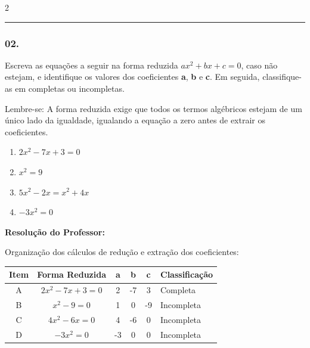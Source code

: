 \begin{multicols*}{2}
\par\vspace{\espacoQuestao}

\noindent\textcolor{CorLinha}{\rule{\linewidth}{0.5pt}} 
\par\vspace{\espacoPreQuestao}
\subsubsection*{02.} Escreva as equações a seguir na forma reduzida $ ax^2 + bx + c = 0 $, caso não estejam, e identifique os valores dos coeficientes \textbf{a}, \textbf{b} e \textbf{c}. Em seguida, classifique-as em completas ou incompletas.
\begin{boxdica}
Lembre-se: A forma reduzida exige que todos os termos algébricos estejam de um único lado da igualdade, igualando a equação a zero antes de extrair os coeficientes.
\end{boxdica}
\begin{enumerate}[label=\Alph*), itemsep=\espacoAlt]
    \item $ 2x^2 - 7x + 3 = 0 $
    \item $ x^2 = 9 $
    \item $ 5x^2 - 2x = x^2 + 4x $
    \item $ -3x^2 = 0 $
\end{enumerate}

\ifgabarito
    \begin{tcolorbox}[colback=CorTitUm!5, colframe=CorTitUm, boxrule=1pt, arc=4pt, left=6pt, right=6pt, top=6pt, bottom=6pt]
    \small\textbf{\textcolor{CorTitUm}{Resolução do Professor:}}\par\vspace{0.1cm}
    \color{CinzaEscuro}
    Organização dos cálculos de redução e extração dos coeficientes:
    \vspace{0.2cm}
    \begin{center}
    \begin{tabular}{|c|c|c|c|c|l|}
    \hline
    \textbf{Item} & \textbf{Forma Reduzida} & \textbf{a} & \textbf{b} & \textbf{c} & \textbf{Classificação} \\
    \hline
    A & $2x^2 - 7x + 3 = 0$ & 2 & -7 & 3 & Completa \\
    \hline
    B & $x^2 - 9 = 0$ & 1 & 0 & -9 & Incompleta \\
    \hline
    C & $4x^2 - 6x = 0$ & 4 & -6 & 0 & Incompleta \\
    \hline
    D & $-3x^2 = 0$ & -3 & 0 & 0 & Incompleta \\
    \hline
    \end{tabular}
    \end{center}
    \end{tcolorbox}
\fi


\end{multicols*}
